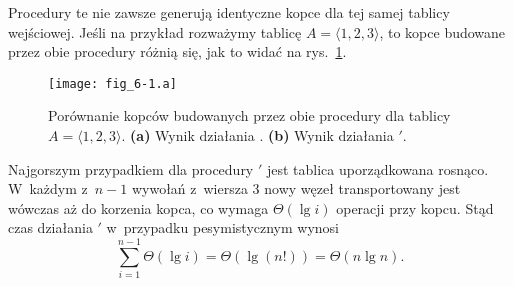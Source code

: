 
\subproblem %
Procedury te nie zawsze generują identyczne kopce dla tej samej tablicy wejściowej.
Jeśli na przykład rozważymy tablicę $A=\langle1,2,3\rangle$, to kopce budowane przez obie procedury różnią się, jak to widać na rys.\ \ref{fig:6-1(a)}.
\begin{figure}[ht]
	\begin{center}
		\texttt{[image: fig\_6-1.a]}
	\end{center}
	\caption{Porównanie kopców budowanych przez obie procedury dla tablicy $A=\langle1,2,3\rangle$.
{\sffamily\bfseries(a)} Wynik działania .
{\sffamily\bfseries(b)} Wynik działania $'$.} \label{fig:6-1(a)}
\end{figure}

\subproblem %
Najgorszym przypadkiem dla procedury $'$ jest tablica uporządkowana rosnąco.
W~każdym z~$n-1$ wywołań  z~wiersza 3 nowy węzeł transportowany jest wówczas aż do korzenia kopca, co wymaga $\Theta(\lg i)$ operacji przy  kopcu.
Stąd czas działania $'$ w~przypadku pesymistycznym wynosi
\[
	\sum_{i=1}^{n-1}\Theta(\lg i) = \Theta(\lg(n!)) = \Theta(n\lg n).
\]
